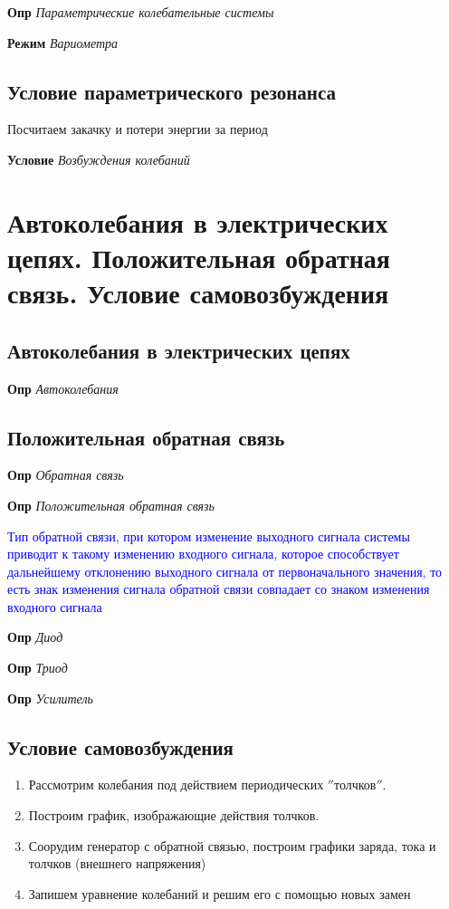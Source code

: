 \documentclass[a4paper, 14pt]{article}
\begin{document}
    \textbf{Опр} \textit{Параметрические колебательные системы}
    
    \textbf{Режим} \textit{Вариометра}
    
    \subsection{Условие параметрического резонанса}
    
    Посчитаем закачку и потери энергии за период
    
    \textbf{Условие} \textit{Возбуждения колебаний}
    
    \section{Автоколебания в электрических цепях.
    Положительная обратная связь.
    Условие самовозбуждения}
    
    \subsection{Автоколебания в электрических цепях}
    
    \textbf{Опр} \textit{Автоколебания}
    
    \subsection{Положительная обратная связь}
    
    \textbf{Опр} \textit{Обратная связь}
    
    \textbf{Опр} \textit{Положительная обратная связь}
    
    \textcolor{blue}{Тип обратной связи, при котором изменение выходного сигнала системы приводит к такому изменению
    входного сигнала, которое способствует дальнейшему отклонению выходного сигнала от первоначального значения, то
    есть знак изменения сигнала обратной связи совпадает со знаком изменения входного сигнала}
    
    \textbf{Опр} \textit{Диод}
    
    \textbf{Опр} \textit{Триод}
    
    \textbf{Опр} \textit{Усилитель}
    
    \subsection{Условие самовозбуждения}
    
    \begin{enumerate}
        \item Рассмотрим колебания под действием периодических \(''\)толчков\(''\).
        \item Построим график, изображающие действия толчков.
        \item Соорудим генератор с обратной связью, построим графики заряда, тока и толчков (внешнего напряжения)
        \item Запишем уравнение колебаний и решим его с помощью новых замен
    \end{enumerate}
    
\end{document}
